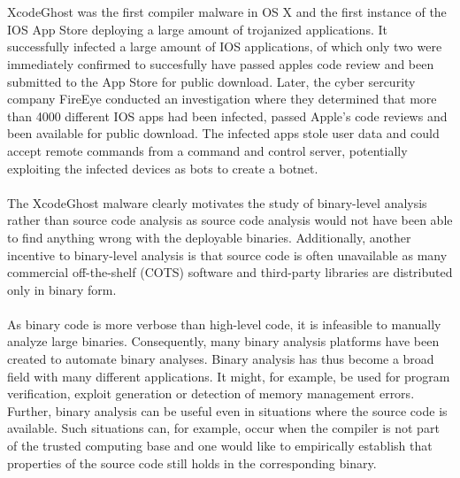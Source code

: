 \documentclass{kththesis}
\begin{document}
\\ \\
XcodeGhost was the first compiler malware in OS X and the first instance of the IOS App Store deploying a large amount of trojanized applications\cite{XcodeGhost}\cite{XcodeGhostFireEye}. It successfully infected a large amount of IOS applications, of which only two were immediately confirmed to succesfully have passed apples code review and been submitted to the App Store for public download\cite{XcodeGhost}. Later, the cyber sercurity company FireEye conducted an investigation where they determined that more than 4000 different IOS apps had been infected, passed Apple's code reviews and been available for public download. The infected apps stole user data and could accept remote commands from a command and control server\cite{XcodeGhostFireEye}, potentially exploiting the infected devices as bots to create a botnet.
\\ \\
The XcodeGhost malware clearly motivates the study of binary-level analysis rather than source code analysis as source code analysis would not have been able to find anything wrong with the deployable binaries. Additionally, another incentive to binary-level analysis is that source code is often unavailable as many commercial off-the-shelf (COTS) software and third-party libraries are distributed only in binary form\cite{preciseCFG}.
\\ \\
As binary code is more verbose than high-level code, it is infeasible to manually analyze large binaries. Consequently, many binary analysis platforms have been created to automate binary analyses\cite{BitBlaze}\cite{BAP}\cite{TrABin}\cite{CodeSurfer}. Binary analysis has thus become a broad field with many different applications. It might, for example, be used for program verification\cite{TrABin}, exploit generation\cite{angr} or detection of memory management errors\cite{valgrind}. Further, binary analysis can be useful even in situations where the source code is available. Such situations can, for example, occur when the compiler is not part of the trusted computing base and one would like to empirically establish that properties of the source code still holds in the corresponding binary.
\end{document}
